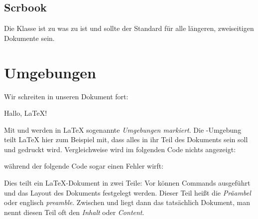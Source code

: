 \subsection{Scrbook}
Die Klasse  ist zu  was  zu  ist und sollte der Standard für alle längeren, zweiseitigen Dokumente sein.


\section{Umgebungen}
Wir schreiten in unseren Dokument fort:
\begin{latexlisting}
	
		Hallo, LaTeX!
	
\end{latexlisting}
Mit  und  werden in \LaTeX{} sogenannte \emph{Umgebungen markiert}.
Die -Umgebung teilt \LaTeX{} hier zum Beispiel mit, dass alles in ihr Teil des Dokuments sein soll und gedruckt wird.
Vergleichweise wird im folgenden Code nichts angezeigt:
während der folgende Code sogar einen Fehler wirft:
Dies teilt ein \LaTeX{}-Dokument in zwei Teile:
Vor  können Commands ausgeführt und das Layout des Dokuments festgelegt werden.
Dieser Teil heißt die \emph{Präambel} oder englisch \emph{preamble}.
Zwischen  und  liegt dann das tatsächlich Dokument, man nennt diesen Teil oft den \emph{Inhalt} oder \emph{Content}.

